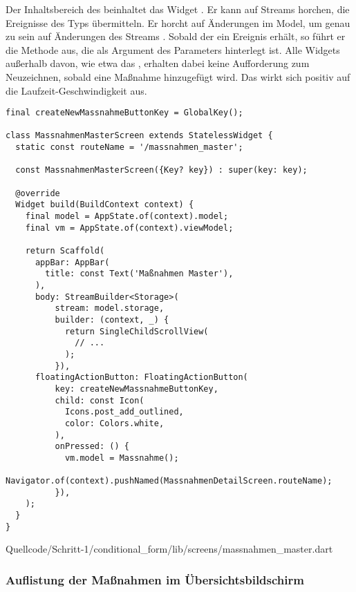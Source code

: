 Der Inhaltsbereich des  beinhaltet das Widget  . Er kann auf Streams horchen, die Ereignisse des Typs  übermitteln. Er horcht auf Änderungen im Model, um genau zu sein auf Änderungen des Streams  . Sobald der  ein Ereignis erhält, so führt er die Methode aus, die als Argument des Parameters  hinterlegt ist. Alle Widgets außerhalb davon, wie etwa das , erhalten dabei keine Aufforderung zum Neuzeichnen, sobald eine Maßnahme hinzugefügt wird. Das wirkt sich positiv auf die Laufzeit-Geschwindigkeit aus.


\ifincludeall
  \begin{listing}[htbp]
    \renewcommand\theFancyVerbLine{%
      \ifnum\value{FancyVerbLine}=31
      \setcounter{FancyVerbLine}{85}
      \tiny\ldots
      \else
      \tiny\arabic{FancyVerbLine}%
      \fi
    }
    \begin{verbatim}
final createNewMassnahmeButtonKey = GlobalKey();

class MassnahmenMasterScreen extends StatelessWidget {
  static const routeName = '/massnahmen_master';

  const MassnahmenMasterScreen({Key? key}) : super(key: key);

  @override
  Widget build(BuildContext context) {
    final model = AppState.of(context).model;
    final vm = AppState.of(context).viewModel;

    return Scaffold(
      appBar: AppBar(
        title: const Text('Maßnahmen Master'),
      ),
      body: StreamBuilder<Storage>(
          stream: model.storage,
          builder: (context, _) {
            return SingleChildScrollView(
              // ...
            );
          }),
      floatingActionButton: FloatingActionButton(
          key: createNewMassnahmeButtonKey,
          child: const Icon(
            Icons.post_add_outlined,
            color: Colors.white,
          ),
          onPressed: () {
            vm.model = Massnahme();
            Navigator.of(context).pushNamed(MassnahmenDetailScreen.routeName);
          }),
    );
  }
}
\end{verbatim}
     {Quellcode/Schritt-1/conditional_form/lib/screens/massnahmen_master.dart}
    \label{lst:Schritt1KlasseMassnahmenMasterScreenStruktur}
  \end{listing}
\fi

\clearpage
\subsubsection{Auflistung der Maßnahmen im Übersichtsbildschirm}
 
